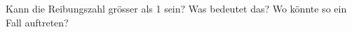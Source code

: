 %
\begin{aufgabe}
	Kann die Reibungszahl grösser als 1 sein?%
	Was bedeutet das?
	Wo könnte so ein Fall auftreten?%
\end{aufgabe}
